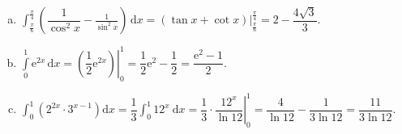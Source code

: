 \begin{vd}
{\begin{enumerate}[a)]
			\item $\displaystyle\int_{\frac{\pi}{6}}^{\frac{\pi}{4}}\left(\dfrac{1}{\cos ^2 x}-\frac{1}{\sin ^2 x}\right) \mathrm{\,d} x=\left.\left(\tan x + \cot x \right) \right|_\frac{\pi}{6}^\frac{\pi}{4}=2-\dfrac{4\sqrt{3}}{3}$.
			\item $\displaystyle \int \limits_0^1 \mathrm{e}^{2 x}\mathrm{\,d}x=\left.\left(\dfrac{1}{2} \mathrm{e}^{2 x}\right)\right|_0^1=\dfrac{1}{2} \mathrm{e}^2-\dfrac{1}{2}=\dfrac{\mathrm{e}^2-1}{2}$.
			\item $\displaystyle\int_0^1\left(2^{2 x} \cdot 3^{x-1}\right) \mathrm{d} x=\dfrac{1}{3} \displaystyle\int_0^1 12^x \mathrm{~d} x=\left.\dfrac{1}{3} \cdot \dfrac{12^x}{\ln 12}\right|_0 ^1=\dfrac{4}{\ln 12}-\dfrac{1}{3 \ln 12}=\dfrac{11}{3 \ln 12} .$
	\end{enumerate}}
\end{vd}

